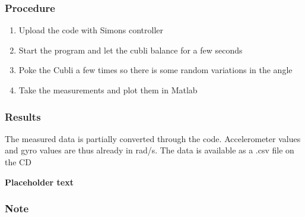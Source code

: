 \subsubsection{Procedure}
\begin{enumerate}
	\item Upload the code with Simons controller
	\item Start the program and let the cubli balance for a few seconds
	\item Poke the Cubli a few times so there is some random variations in the angle
	\item Take the measurements and plot them in Matlab
\end{enumerate}


\subsubsection{Results}
The measured data is partially converted through the code. Accelerometer values and gyro values are thus already in rad/s. 
The data is available as a .csv file on the CD

\small\textbf{Placeholder text}

\subsubsection{Note}



